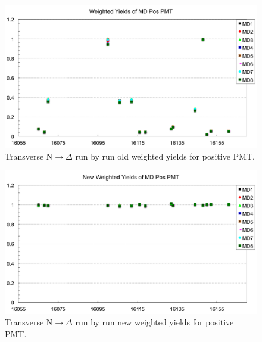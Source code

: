 \begin{figure}[!h]
	\begin{center}
	\includegraphics[width=15.0cm]{figures/transverseN2DeltaRunByRunWeightedYieldsPosPMT_old}
	\end{center}
	\caption
	{Transverse N$\rightarrow\Delta$ run by run old weighted yields for positive PMT.}
	\label{fig:transverseN2DeltaRunByRunWeightedYieldsPosPMT_old}
\end{figure}

\begin{figure}[!h]
	\begin{center}
	\includegraphics[width=15.0cm]{figures/transverseN2DeltaRunByRunWeightedYieldsPosPMT_UnZoomed}
	\end{center}
	\caption
	{Transverse N$\rightarrow\Delta$ run by run new weighted yields for positive PMT.}
	\label{fig:transverseN2DeltaRunByRunWeightedYieldsPosPMT_UnZoomed}
\end{figure}

